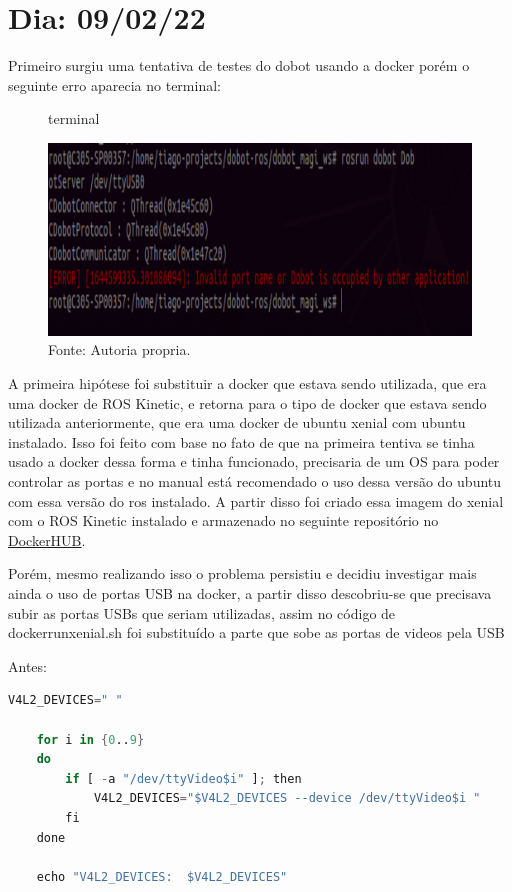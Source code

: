 \chapter{Dia: 09/02/22}
\label{chap:09-02-22}

Primeiro surgiu uma tentativa de testes do dobot usando a docker porém o seguinte erro aparecia no terminal:

\begin{figure}[h!]
    \centering
    \caption{terminal}
    \includegraphics[width=1\textwidth]{Figures/dob1.jpg}
    \caption*{Fonte: Autoria propria.}
    \label{fig:teminal1}
\end{figure}

A primeira hipótese foi substituir a docker que estava sendo utilizada, que era uma docker de ROS Kinetic, e retorna para o tipo de docker que estava sendo utilizada anteriormente, que era uma docker de ubuntu xenial com ubuntu instalado. Isso foi feito com base no fato de que na primeira tentiva se tinha usado a docker dessa forma e tinha funcionado, precisaria de um OS para poder controlar as portas e no manual está recomendado o uso dessa versão do ubuntu com essa versão do ros instalado. A partir disso foi criado essa imagem do xenial com o ROS Kinetic instalado e armazenado no seguinte repositório no \href{https://hub.docker.com/repository/docker/tiago369/ubuntu-kinect}{DockerHUB}.

Porém, mesmo realizando isso o problema persistiu e decidiu investigar mais ainda o uso de portas USB na docker, a partir disso descobriu-se que precisava subir as portas USBs que seriam utilizadas, assim no código de docker\underline{\space}run\underline{\space}xenial.sh foi substituído a parte que sobe as portas de videos pela USB

Antes:

\begin{lstlisting}[language=Awk]
    V4L2_DEVICES=" "

    for i in {0..9}
    do
        if [ -a "/dev/ttyVideo$i" ]; then
            V4L2_DEVICES="$V4L2_DEVICES --device /dev/ttyVideo$i "
        fi
    done

    echo "V4L2_DEVICES:  $V4L2_DEVICES"
\end{lstlisting}

